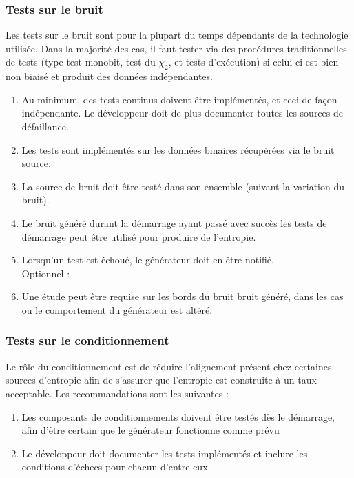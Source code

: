\subsubsection{Tests sur le bruit}
Les tests sur le bruit sont pour la plupart du temps dépendants de la technologie utilisée. Dans la majorité des cas, il faut tester via des procédures traditionnelles de tests (type test monobit, test du $\chi_2$, et tests d'exécution) si celui-ci est bien non biaisé et produit des données indépendantes.
\begin{enumerate}
\item Au minimum, des tests continus doivent être implémentés, et ceci de façon indépendante. Le développeur doit de plus documenter toutes les sources de défaillance.
\item Les tests sont implémentés sur les données binaires récupérées via le bruit source.
\item La source de bruit doit être testé dans son ensemble (suivant la variation du bruit).
\item Le bruit généré durant la démarrage ayant passé avec succès les tests de démarrage peut être utilisé pour produire de l'entropie.
\item Lorsqu'un test est échoué, le générateur doit en être notifié.\\

Optionnel : 
\item Une étude peut être requise sur les bords du bruit bruit généré, dans les cas ou le comportement du générateur est altéré.
\end{enumerate}


\subsubsection{Tests sur le conditionnement}
Le rôle du conditionnement est de réduire l'alignement  présent chez certaines sources d'entropie afin de s'assurer que l'entropie est construite à un taux acceptable. Les recommandations sont les suivantes :
\begin{enumerate}
\item Les composants de conditionnements doivent être testés dès le démarrage, afin d'être certain que le générateur fonctionne comme prévu
\item Le développeur doit documenter les tests implémentés et inclure les conditions d'échecs pour chacun d'entre eux.
\end{enumerate}



